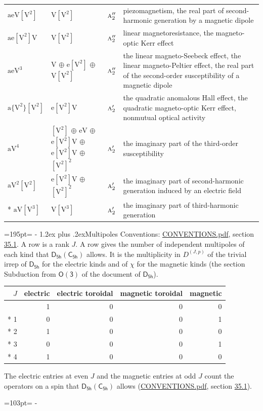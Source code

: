 \documentclass[10pt,a4paper]{article}
\makeatletter
\renewcommand\section{\@startsection{section}{1}{\z@}{-3ex plus -1ex minus -.2ex}%
  {1.2ex plus .2ex}{\normalfont\large\sffamily\bfseries\color{parttitle}}}
\newcommand{\needspace}[1]{\par\penalty-100\begingroup\dimen0=#1\relax\dimen2=\pagegoal
  \advance\dimen2-\pagetotal\ifdim\dimen0>\dimen2\relax\ifdim\dimen2>0pt\vfil\break\fi\fi
  \endgroup}
\numberwithin{equation}{section}
\newcommand{\grp}[1]{\mathsf{#1}}
\newcommand{\irr}[1]{\text{\normalfont\scshape #1}}
\newcommand{\irrJp}[2]{D^{(#1,#2)}}
\newcommand{\jahn}[1]{\mathrm{#1}}
\newlength{\fillwidth}\newlength{\cellwidth}\newlength{\colwidth}
\makeatother
\begin{document}
{\begin{longtable}{@{}lll>{\RaggedRight\arraybackslash}p{\fillwidth}@{}}
$\jahn{aeV[V^{2}]}$ & $\jahn{V[V^{2}]}$ & $\irr{a}_{2}''$ & piezomagnetism, the real part of second-harmonic generation by a magnetic dipole\\
$\jahn{ae[V^{2}]V}$ & $\jahn{V[V^{2}]}$ & $\irr{a}_{2}''$ & linear magnetoresistance, the magneto-optic Kerr effect\\
$\jahn{aeV^{3}}$ & $\jahn{V}$ $\oplus$ $\jahn{e[V^{2}]}$ $\oplus$ $\jahn{V[V^{2}]}$ & $\irr{a}_{2}''$ & the linear magneto-Seebeck effect, the linear magneto-Peltier effect, the real part of the second-order susceptibility of a magnetic dipole\\
$\jahn{a\{V^{2}\}[V^{2}]}$ & $\jahn{e[V^{2}]V}$ & $\irr{a}_{2}'$ & the quadratic anomalous Hall effect, the quadratic magneto-optic Kerr effect, nonmutual optical activity\\
$\jahn{aV^{4}}$ & $\jahn{[V^{2}]}$ $\oplus$ $\jahn{eV}$ $\oplus$ $\jahn{e[V^{2}]V}$ $\oplus$ $\jahn{e[V^{2}]V}$ $\oplus$ $\jahn{[V^{2}]^{2}}$ & $\irr{a}_{2}'$ & the imaginary part of the third-order susceptibility\\
$\jahn{aV^{2}[V^{2}]}$ & $\jahn{e[V^{2}]V}$ $\oplus$ $\jahn{[V^{2}]^{2}}$ & $\irr{a}_{2}'$ & the imaginary part of second-harmonic generation induced by an electric field\\*
$\jahn{aV[V^{3}]}$ & $\jahn{V[V^{3}]}$ & $\irr{a}_{2}'$ & the imaginary part of third-harmonic generation\\
\bottomrule\end{longtable}}
\needspace{195pt}
\section{Multipoles}\label{s:multipoles}
Conventions: \href{../../CONVENTIONS.pdf}{CONVENTIONS.pdf}, section \href{../../CONVENTIONS.pdf\#conv.35.1}{35.1}.
A row is a rank $J$. \label{n:head.multipole.electric}\label{n:head.multipole.electric.toroidal}\label{n:head.multipole.magnetic.toroidal}\label{n:head.multipole.magnetic}A row gives the number of independent multipoles of each kind that $\grp{D_{5h}}(\grp{C_{5h}})$ allows. It is the multiplicity in $\irrJp{J}{p}$ of the trivial irrep of $\grp{D_{5h}}$ for the electric kinds and of $\chi$ for the magnetic kinds (the section Subduction from $\grp{O(3)}$ of the document of \href{../../../rotation/data/pdf/D5h.pdf}{$\grp{D_{5h}}$}).
{\small\begin{longtable}{@{}rrrrr@{}}\toprule
$J$ & electric & electric toroidal & magnetic toroidal & magnetic\\\midrule\endhead
\bottomrule\endfoot\endlastfoot
0 & 1 & 0 & 0 & 0\\*
1 & 0 & 0 & 0 & 1\\*
2 & 1 & 0 & 0 & 0\\*
3 & 0 & 0 & 0 & 1\\*
4 & 1 & 0 & 0 & 0\\
\bottomrule\end{longtable}}
The electric entries at even $J$ and the magnetic entries at odd $J$ count the operators on a spin that $\grp{D_{5h}}(\grp{C_{5h}})$ allows (\href{../../CONVENTIONS.pdf}{CONVENTIONS.pdf}, section \href{../../CONVENTIONS.pdf\#conv.35.1}{35.1}).
\needspace{103pt}
\end{document}
